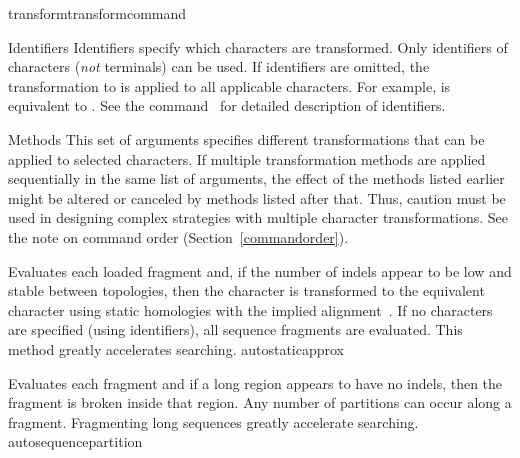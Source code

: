 \begin{command}{transform}{transformcommand}
\begin{arguments}
        \begin{argumentgroup}{Identifiers}
            Identifiers specify which characters are transformed. Only
            identifiers of characters (\emph{not} terminals) can be used. If
            identifiers are omitted, the transformation to is applied to all
            applicable characters. For example,
             is equivalent to
            . See the command~
            for detailed description of identifiers.
        \end{argumentgroup}
           
           \begin{argumentgroup}{Methods}
            This set of arguments specifies different transformations that can be applied
            to selected characters. If multiple transformation methods are applied
            sequentially in the same list of arguments, the effect of the methods listed
            earlier might be altered or canceled by methods listed after that. Thus, caution
            must be used in designing complex strategies with multiple character
            transformations. See the note on command order (Section~\ref{commandorder}).

            {Evaluates each loaded fragment and, if the number of indels
            appear to be low and stable between topologies, then the character
            is transformed to the equivalent character using static homologies
            with the implied alignment~\cite{wheeler2003}. If no characters are
            specified (using identifiers), all sequence fragments are evaluated.
            This method greatly accelerates searching.}
            {autostaticapprox}

            {Evaluates each fragment and if a long region appears 
            to have no indels, then the fragment is broken inside that region.
            Any number of partitions can occur along a fragment. Fragmenting
            long sequences greatly accelerate searching.}
            {autosequencepartition}


\end{argumentgroup}
\end{arguments}
\end{command}
